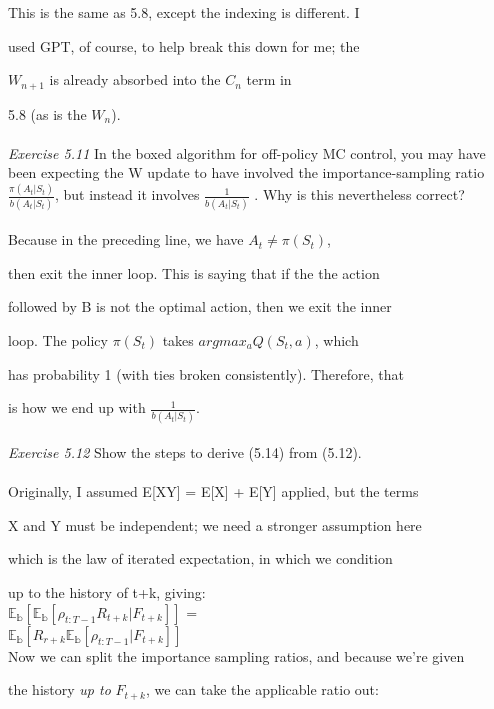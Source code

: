 \documentclass{article}
\begin{document}
This is the same as 5.8, except the indexing is different. I 

used GPT, of course, to help break this down for me; the 

$W_{n+1}$ is already absorbed into the $C_{n}$ term in 

5.8 (as is the $W_{n}$). 
\\\\
\textit{Exercise 5.11} In the boxed algorithm for off-policy MC control, you may have been expecting the W update to have involved the importance-sampling ratio $\frac{\pi(A_{t}|S_{t})}{b(A_{t}|S_{t})}$, but instead it involves $\frac{1}{b(A_{t}|S_{t})}$ . Why is this nevertheless correct?
\\
\\

Because in the preceding line, we have $A_{t} \neq \pi(S_{t})$, 

then exit the inner loop. This is saying that if the the action

followed by B is not the optimal action, then we exit the inner 

loop. The policy $\pi(S_{t})$ takes $argmax_{a}Q(S_{t}, a)$, which

has probability 1 (with ties broken consistently). Therefore, that

is how we end up with $\frac{1}{b(A_{t}|S_{t})}.$
\\\\
\textit{Exercise 5.12} Show the steps to derive (5.14) from (5.12).
\\
\\

Originally, I assumed E[XY] = E[X] + E[Y] applied, but the terms 

X and Y must be independent; we need a stronger assumption here 

which is the law of iterated expectation, in which we condition 

up to the history of t+k, giving:\\

$\mathbb{E_{b}}[\mathbb{E_{b}}[\rho_{t:T-1}R_{t+k}|F_{t+k}]]$ \indent = \\
\indent $\mathbb{E_{b}}[R_{r+k}\mathbb{E_{b}}[\rho_{t:T-1}|F_{t+k}]]$
\\

Now we can split the importance sampling ratios, and because we're given

the history \textit{up to} $F_{t+k}$, we can take the applicable ratio out: 
\end{document}
